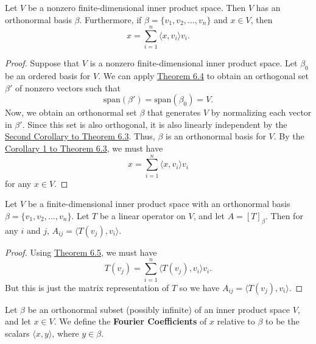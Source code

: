 \begin{theorem}\label{Theorem 6.5}
   Let \( V  \) be a nonzero finite-dimensional inner product space. Then \( V  \) has an orthonormal basis \( \beta \). Furthermore, if \( \beta = \{ {v}_{1}, {v}_{2}, \dots, {v}_{n} \}  \) and \( x \in V  \), then 
   \[  x = \sum_{ i=1  }^{ n } \langle x , {v}_{i} \rangle {v}_{i}. \]
\end{theorem}
\begin{proof}
Suppose that \( V  \) is a nonzero finite-dimensional inner product space. Let \( {\beta}_{0} \) be an ordered basis for \( V  \). We can apply {\hyperref[Theorem 6.4]{Theorem 6.4}} to obtain an orthogonal set \( \beta'  \) of nonzero vectors such that
\[  \text{span}(\beta') = \text{span}({\beta}_{0}) = V. \]
Now, we obtain an orthonormal set \( \beta \) that generates \( V  \) by normalizing each vector in \( \beta'  \). Since this set is also orthogonal, it is also linearly independent by the {\hyperref[Corollary 2 to Theorem 6.3]{Second Corollary to Theorem 6.3}}. Thus, \( \beta  \) is an orthonormal basis for \( V  \). By the {\hyperref[Corollary 1 to Theorem 6.3]{Corollary 1 to Theorem 6.3}}, we must have
\[  x = \sum_{ i=1  }^{  n } \langle x , {v}_{i} \rangle {v}_{i} \]
for any \( x \in V  \).
\end{proof}

\begin{corollary}
    Let \( V  \) be a finite-dimensional inner product space with an orthonormal basis \( \beta = \{ {v}_{1}, {v}_{2}, \dots, {v}_{n} \}  \). Let \( T  \) be a linear operator on \( V  \), and let \( A = [T]_{\beta} \). Then for any \( i  \) and \( j \), \( {A}_{ij} = \langle T({v}_{j}) , {v}_{i} \rangle. \)
\end{corollary}

\begin{proof}
Using {\hyperref[Theorem 6.5]{Theorem 6.5}}, we must have  
\[  T({v}_{j}) = \sum_{ i=1  }^{ n } \langle T({v}_{j}) , {v}_{i} \rangle {v}_{i}. \]
But this is just the matrix representation of \( T \) so we have \( {A}_{ij} = \langle T({v}_{j}) , {v}_{i} \rangle \).
\end{proof}

\begin{definition}
    Let \( \beta \) be an orthonormal subset (possibly infinite) of an inner product space \( V  \), and let \( x \in V  \). We define the \textbf{Fourier Coefficients} of \( x  \) relative to \( \beta  \) to be the scalars \( \langle x , y \rangle \), where \( y \in \beta \).
\end{definition}


